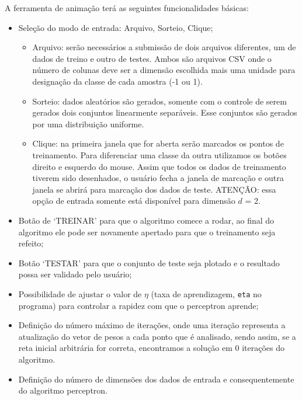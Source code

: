 \documentclass[brazil, a4paper]{article}
\begin{document}
A ferramenta de animação terá as seguintes funcionalidades básicas:
\begin{itemize} 
	
	\item Seleção do modo de entrada: Arquivo, Sorteio, Clique;
	
	\begin{itemize}
		
		\item Arquivo: serão necessários a submissão de dois arquivos
		diferentes, um de dados de treino e outro de testes. Ambos são arquivos
		CSV onde o número de colunas deve ser a dimensão escolhida mais uma
		unidade para designação da classe de cada amostra (-1 ou 1).
		
		\item Sorteio: dados aleatórios são gerados, somente com o controle de
		serem gerados dois conjuntos linearmente separáveis. Esse conjuntos são
		gerados por uma distribuição uniforme.
		
		\item Clique: na primeira janela que for aberta serão marcados os pontos
		de treinamento. Para diferenciar uma classe da outra utilizamos os
		botões direito e esquerdo do mouse. Assim que todos os dados de
		treinamento tiverem sido desenhados, o usuário fecha a janela de
		marcação e outra janela se abrirá para marcação dos dados de teste.
		ATENÇÃO: essa opção de entrada somente está disponível para dimensão
		$d$ = 2.

	\end{itemize}

	\item Botão de `TREINAR' para que o algoritmo comece a rodar, ao final do
	algoritmo ele pode ser novamente apertado para que o treinamento seja
	refeito;
	
	\item Botão `TESTAR' para que o conjunto de teste seja plotado e o resultado
	possa ser validado pelo usuário;
	
	\item Possibilidade de  ajustar o valor de $\eta$ (taxa de aprendizagem,
	\texttt{eta} no programa) para controlar a rapidez com que o perceptron
	aprende;
	
	\item Definição do número máximo de iterações, onde uma iteração representa
	a atualização do vetor de pesos a cada ponto que é analisado, sendo assim,
	se a reta inicial arbitrária for correta, encontramos a solução em 0
	iterações do algoritmo.
	
	\item Definição do número de dimensões dos dados de entrada e
	consequentemente do algoritmo perceptron.

\end{itemize}
\end{document}
